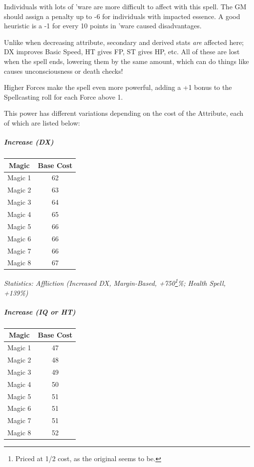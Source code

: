 \begin{multicols*}{3}
	Individuals with lots of 'ware are more difficult to affect with this spell. The GM should assign a penalty up to -6 for individuals with impacted essence. A good heuristic is a -1 for every 10 points in 'ware caused disadvantages.
	
	Unlike when decreasing attribute, secondary and derived stats \textit{are} affected here; DX improves Basic Speed, HT gives FP, ST gives HP, etc. All of these are lost when the spell ends, lowering them by the same amount, which can do things like causes unconsciousness or death checks!
	
	Higher Forces make the spell even more powerful, adding a +1 bonus to the Spellcasting roll for each Force above 1.
	
	This power has different variations depending on the cost of the Attribute, each of which are listed below:
		
	\subparagraph{Increase (DX)}
	
	\begin{center}
		\begin{tabular}{|c|c|}
			\hline
			Magic & Base Cost \\
			\hline
			\hline
			Magic 1 & 62 \\
			Magic 2 & 63 \\
			Magic 3 & 64 \\
			Magic 4 & 65 \\
			Magic 5 & 66 \\
			Magic 6 & 66 \\
			Magic 7 & 66 \\
			Magic 8 & 67 \\
			\hline
		\end{tabular}
	\end{center}	
	
	\textcolor{OliveGreen}{\textit{Statistics: Affliction (Increased DX, Margin-Based, +750\footnote{Priced at 1/2 cost, as the original seems to be.}\%; Health Spell, +139\%) }}
	
	\subparagraph{Increase (IQ or HT)}
	
	\begin{center}
		\begin{tabular}{|c|c|}
			\hline
			Magic & Base Cost \\
			\hline
			\hline
			Magic 1 & 47 \\
			Magic 2 & 48 \\
			Magic 3 & 49  \\
			Magic 4 & 50 \\
			Magic 5 & 51 \\
			Magic 6 & 51 \\
			Magic 7 & 51 \\
			Magic 8 & 52 \\
			\hline
		\end{tabular}
	\end{center}	
	

\end{multicols*}

